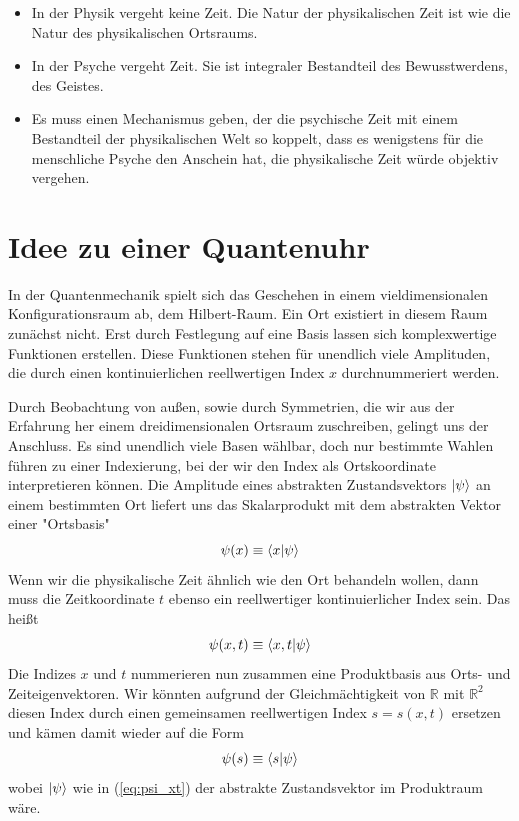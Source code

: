 \documentclass[12pt]{article}
\begin{document}
\begin{itemize}
\item In der Physik vergeht keine Zeit. Die Natur der physikalischen Zeit ist wie die Natur des physikalischen Ortsraums.
\item In der Psyche vergeht Zeit. Sie ist integraler Bestandteil des Bewusstwerdens, des Geistes. 
\item Es muss einen Mechanismus geben, der die psychische Zeit mit einem Bestandteil der physikalischen Welt so koppelt, dass es wenigstens für die menschliche Psyche den Anschein hat, die physikalische Zeit würde objektiv vergehen.
\end{itemize}

\section{Idee zu einer Quantenuhr}

In der Quantenmechanik spielt sich das Geschehen in einem vieldimensionalen Konfigurationsraum ab, dem Hilbert-Raum. Ein Ort existiert in diesem Raum zunächst nicht. Erst durch Festlegung auf eine Basis lassen sich komplexwertige Funktionen erstellen. Diese Funktionen stehen für unendlich viele Amplituden, die durch einen kontinuierlichen reellwertigen Index $x$ durchnummeriert werden.

Durch Beobachtung von außen, sowie durch Symmetrien, die wir aus der Erfahrung her einem dreidimensionalen Ortsraum zuschreiben, gelingt uns der Anschluss. Es sind unendlich viele Basen wählbar, doch nur bestimmte Wahlen führen zu einer Indexierung, bei der wir den Index als Ortskoordinate interpretieren können. Die Amplitude eines abstrakten Zustandsvektors $\ket{\psi}$ an einem bestimmten Ort liefert uns das Skalarprodukt mit dem abstrakten Vektor einer "Ortsbasis"
\begin{equation} 
\psi(x) \equiv \bra{x}\ket{\psi} 
\end{equation}
Wenn wir die physikalische Zeit ähnlich wie den Ort behandeln wollen, dann muss die Zeitkoordinate $t$ ebenso ein reellwertiger kontinuierlicher Index sein. Das heißt
\begin{equation} 
\label{eq:psi_xt}
\psi(x,t) \equiv \bra{x,t}\ket{\psi} 
\end{equation}
Die Indizes $x$ und $t$ nummerieren nun zusammen eine Produktbasis aus Orts- und Zeiteigenvektoren. Wir könnten aufgrund der Gleichmächtigkeit von $\mathbb{R}$ mit $\mathbb{R}^2$ diesen Index durch einen gemeinsamen reellwertigen Index $s = s(x,t)$ ersetzen und kämen damit wieder auf die Form
\begin{equation}
\label{eq:psi_s}
\psi(s) \equiv \bra{s}\ket{\psi} 
\end{equation}
wobei $\ket{\psi}$ wie in (\ref{eq:psi_xt}) der abstrakte Zustandsvektor im Produktraum wäre.
\end{document}
